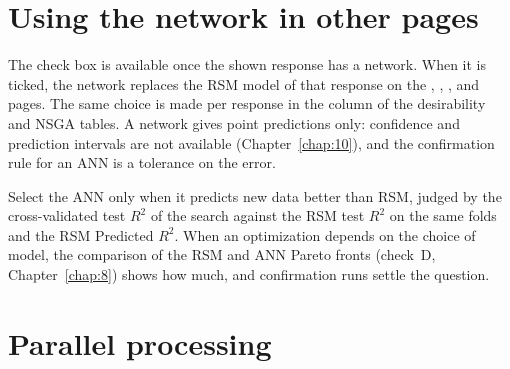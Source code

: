 \section{Using the network in other pages}\label{sec:ch07-use}

The check box  is available once the
shown response has a network. When it is ticked, the network replaces the RSM model of that response on the
, , ,  and 
pages. The same choice is made per response in the  column of the desirability and NSGA tables. A network
gives point predictions only: confidence and prediction intervals are not available (Chapter~\ref{chap:10}), and the
confirmation rule for an ANN is a tolerance on the error.

Select the ANN only when it predicts new data better than RSM, judged by the cross-validated test $R^2$ of the
search against the RSM test $R^2$ on the same folds and the RSM Predicted $R^2$. When an optimization depends on
the choice of model, the comparison of the RSM and ANN Pareto fronts (check~D, Chapter~\ref{chap:8}) shows how much, and
confirmation runs settle the question.

\section{Parallel processing}\label{sec:ch07-parallel}

